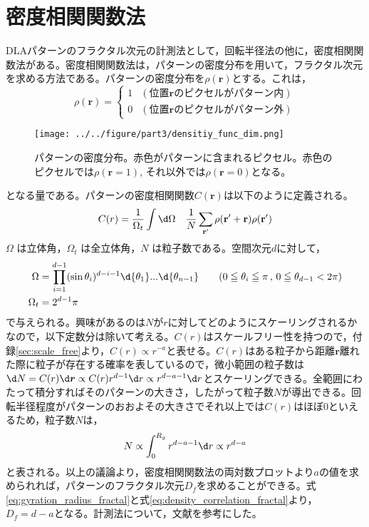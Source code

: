\documentclass[autodetect-engine,dvi=dvipdfmx,a4paper,ja=standard,oneside,openany,11pt,draft]{bxjsbook}
\begin{document}
\section{密度相関関数法}
DLAパターンのフラクタル次元の計測法として，回転半径法の他に，密度相関関数法がある。密度相関関数法は，パターンの密度分布を用いて，フラクタル次元を求める方法である。パターンの密度分布を$\rho(\bm{r})$とする。これは，
\begin{equation}
  \rho(\bm{r})=
  \begin{cases}
    1 & (\mathrm{位置\bm{r}のピクセルがパターン内}) \\
    0 & (\mathrm{位置\bm{r}のピクセルがパターン外})
  \end{cases}
  \label{eq:density_distribution}
\end{equation}
\begin{figure}
  \centering
  \texttt{[image: ../../figure/part3/densitiy\_func\_dim.png]}
  \caption{パターンの密度分布。赤色がパターンに含まれるピクセル。赤色のピクセルでは$\rho(\bm{r}=1)$, それ以外では$\rho(\bm{r}=0)$となる。}
  \label{fig:density_func_dif}
\end{figure}
となる量である。パターンの密度相関関数$C(\bm{r})$は以下のように定義される。
\begin{equation}
  C(r)=\frac{1}{\Omega_t}\int \d\Omega \quad \frac{1}{N}\sum_{{\bf{r'}}}\rho({\bf r'+ r})\rho({\bf {r'}})
  \label{eq:density_correlation}
\end{equation}
$\Omega$ は立体角，$\Omega_t$ は全立体角，$N$ は粒子数である。空間次元$d$に対して，
\begin{equation}
  \begin{aligned}
    \Omega   & =\prod^{d-1}_{i=1} (\sin\theta_i)^{d-i-1} \d{\theta_1}...\d{\theta_{n-1}} \qquad(0\leqq \theta_i\leqq \pi\,,\,0\leqq\theta_{d-1}<2\pi) \\
    \Omega_t & =2^{d-1}\pi
  \end{aligned}
  \label{eq:omega}
\end{equation}
で与えられる。興味があるのは$N$が$r$に対してどのようにスケーリングされるかなので，以下定数分は除いて考える。$C(r)$はスケールフリー性を持つので，付録\ref{sec:scale_free}より，$C(r)\propto r^{-a}$と表せる。$C(r)$はある粒子から距離$\bm{r}$離れた際に粒子が存在する確率を表しているので，微小範囲の粒子数は$\d N=C(r)\d \bm{r}\propto C(r)r^{d-1}\d r\propto r^{d-a-1} \d r $とスケーリングできる。全範囲にわたって積分すればそのパターンの大きさ，したがって粒子数$N$が導出できる。回転半径程度がパターンのおおよその大きさでそれ以上では$C(r)$はほぼ0といえるため，粒子数$N$は，
\begin{equation}
  N\propto \int_{0}^{R_g} r^{d-a-1} \d r\propto r^{d-a}
  \label{eq:density_correlation_fractal}
\end{equation}
と表される。以上の議論より，密度相関関数法の両対数プロットより$a$の値を求められれば，パターンのフラクタル次元$D_f$を求めることができる。式\ref{eq:gyration_radius_fractal}と式\ref{eq:density_correlation_fractal}より，$D_f=d-a$となる。計測法について，文献\cite{フラクタルの物理Ⅰ}を参考にした。
\ifdraft{
  
  
}{}
\end{document}
